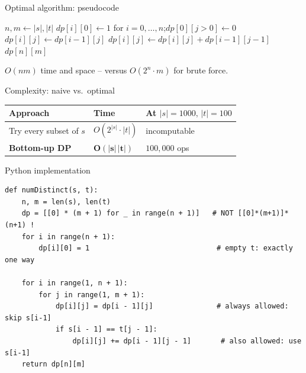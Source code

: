 \documentclass[11pt,aspectratio=169]{beamer}
\begin{document}
\begin{frame}{Optimal algorithm: pseudocode}
  \footnotesize
  \begin{algorithmic}[1]
      \State $n, m \gets |s|, |t|$
      \State $dp[i][0] \gets 1$ for $i = 0,\dots,n$;\quad $dp[0][j>0] \gets 0$
          \State $dp[i][j] \gets dp[i-1][j]$
            \State $dp[i][j] \gets dp[i][j] + dp[i-1][j-1]$
          \EndIf
        \EndFor
      \EndFor
      \State \Return $dp[n][m]$
    \EndFunction
  \end{algorithmic}
  $O(nm)$ time and space -- versus $O(2^n \cdot m)$ for brute force.
\end{frame}

\begin{frame}{Complexity: naive vs.\ optimal}
  \begin{center}
  \begin{tabular}{@{}lll@{}}
    \toprule
    Approach & Time & At $|s|=1000,\,|t|=100$ \\
    \midrule
    Try every subset of $s$ & $O(2^{|s|}\cdot|t|)$ & incomputable \\
    \textbf{Bottom-up DP} & $\boldsymbol{O(|s|\,|t|)}$ & $100{,}000$ ops \\
    \bottomrule
  \end{tabular}
  \end{center}
\end{frame}

\begin{frame}[fragile]{Python implementation}
  \begin{lstlisting}[style=py]
def numDistinct(s, t):
    n, m = len(s), len(t)
    dp = [[0] * (m + 1) for _ in range(n + 1)]   # NOT [[0]*(m+1)]*(n+1) !
    for i in range(n + 1):
        dp[i][0] = 1                              # empty t: exactly one way

    for i in range(1, n + 1):
        for j in range(1, m + 1):
            dp[i][j] = dp[i - 1][j]               # always allowed: skip s[i-1]
            if s[i - 1] == t[j - 1]:
                dp[i][j] += dp[i - 1][j - 1]       # also allowed: use s[i-1]
    return dp[n][m]
  \end{lstlisting}
\end{frame}
\end{document}
